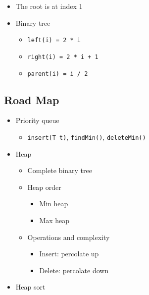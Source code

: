 \documentclass[
  10pt,
  english,
  letterpaper,
,tablecaptionabove
]{scrartcl}
\newcommand{\passthrough}[1]{#1}
\providecommand{\tightlist}{%
  \setlength{\itemsep}{0pt}\setlength{\parskip}{0pt}}
\begin{document}
\begin{itemize}
\tightlist
\item
  The root is at index 1
\item
  Binary tree

  \begin{itemize}
  \tightlist
  \item
    \passthrough{\lstinline!left(i) = 2 * i!}
  \item
    \passthrough{\lstinline!right(i) = 2 * i + 1!}
  \item
    \passthrough{\lstinline!parent(i) = i / 2!}
  \end{itemize}
\end{itemize}

\hypertarget{road-map}{%
\subsection{Road Map}\label{road-map}}

\begin{itemize}
\tightlist
\item
  Priority queue

  \begin{itemize}
  \tightlist
  \item
    \passthrough{\lstinline!insert(T t)!},
    \passthrough{\lstinline!findMin()!},
    \passthrough{\lstinline!deleteMin()!}
  \end{itemize}
\item
  Heap

  \begin{itemize}
  \tightlist
  \item
    Complete binary tree
  \item
    Heap order

    \begin{itemize}
    \tightlist
    \item
      Min heap
    \item
      Max heap
    \end{itemize}
  \item
    Operations and complexity

    \begin{itemize}
    \tightlist
    \item
      Insert: percolate up
    \item
      Delete: percolate down
    \end{itemize}
  \end{itemize}
\item
  Heap sort
\end{itemize}
\end{document}
